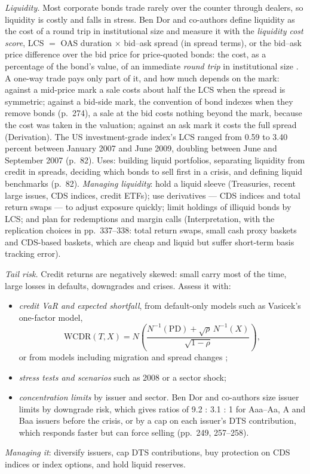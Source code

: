 \begin{qfmethod}\label{meth:credit-liquidity-tail-risk}
 \emph{Liquidity.} Most corporate bonds trade rarely over the counter through dealers, so liquidity is costly and falls in stress. Ben Dor and co-authors define liquidity as the cost of a round trip in institutional size and measure it with the \emph{liquidity cost score}, LCS $=$ OAS duration $\times$ bid--ask spread (in spread terms), or the bid--ask price difference over the bid price for price-quoted bonds: the cost, as a percentage of the bond's value, of an immediate \emph{round trip} in institutional size \citep[pp.~81--82, 88]{ben-dor-credit-portfolio-2012}. A one-way trade pays only part of it, and how much depends on the mark: against a mid-price mark a sale costs about half the LCS when the spread is symmetric; against a bid-side mark, the convention of bond indexes when they remove bonds (p.~274), a sale at the bid costs nothing beyond the mark, because the cost was taken in the valuation; against an ask mark it costs the full spread (Derivation). The US investment-grade index's LCS ranged from 0.59 to 3.40 percent between January 2007 and June 2009, doubling between June and September 2007 (p.~82). Uses: building liquid portfolios, separating liquidity from credit in spreads, deciding which bonds to sell first in a crisis, and defining liquid benchmarks (p.~82). \emph{Managing liquidity}: hold a liquid sleeve (Treasuries, recent large issues, CDS indices, credit ETFs); use derivatives --- CDS indices and total return swaps --- to adjust exposure quickly; limit holdings of illiquid bonds by LCS; and plan for redemptions and margin calls (Interpretation, with the replication choices in pp.~337--338: total return swaps, small cash proxy baskets and CDS-based baskets, which are cheap and liquid but suffer short-term basis tracking error).

\emph{Tail risk.} Credit returns are negatively skewed: small carry most of the time, large losses in defaults, downgrades and crises. Assess it with:
\begin{itemize}
\item \emph{credit VaR and expected shortfall}, from default-only models such as Vasicek's one-factor model,
\[
\mathrm{WCDR}(T,X)=N\!\left(\frac{N^{-1}(\mathrm{PD})+\sqrt{\rho}\,N^{-1}(X)}{\sqrt{1-\rho}}\right),
\]
or from models including migration and spread changes \citep[pp.~413, 416--417]{risk-management-financial-institutions-2023};
\item \emph{stress tests and scenarios} such as 2008 or a sector shock;
\item \emph{concentration limits} by issuer and sector. Ben Dor and co-authors size issuer limits by downgrade risk, which gives ratios of 9.2 : 3.1 : 1 for Aaa--Aa, A and Baa issuers before the crisis, or by a cap on each issuer's DTS contribution, which responds faster but can force selling (pp.~249, 257--258).
\end{itemize}
\emph{Managing it}: diversify issuers, cap DTS contributions, buy protection on CDS indices or index options, and hold liquid reserves.


\end{qfmethod}
